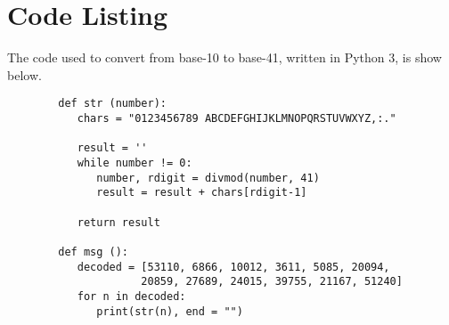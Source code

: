 \documentclass[a4paper]{article}
\begin{document}
	\newpage
	\appendix
	\section{Code Listing} \label{App:AppendixA}
	The code used to convert from base-10 to base-41, written in Python 3, is show below.
	\begin{verbatim}
		def str (number):
		   chars = "0123456789 ABCDEFGHIJKLMNOPQRSTUVWXYZ,:."
		
		   result = ''
		   while number != 0:
		      number, rdigit = divmod(number, 41)
		      result = result + chars[rdigit-1]
		   
		   return result
		
		def msg ():
		   decoded = [53110, 6866, 10012, 3611, 5085, 20094,
		             20859, 27689, 24015, 39755, 21167, 51240]
		   for n in decoded:
		      print(str(n), end = "")
	\end{verbatim}
\end{document}
